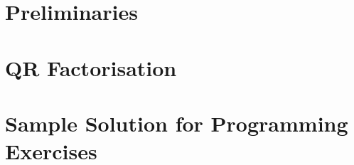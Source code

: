 \documentclass[a4paper,11pt,twoside]{report}
\begin{document}
\chapter{Preliminaries}


\chapter{QR Factorisation}


% 

% 

% 

% 
\appendix
\chapter{Sample Solution for Programming Exercises}

\end{document}
